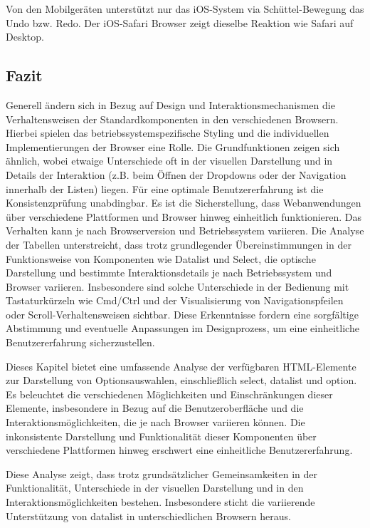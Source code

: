 Von den Mobilgeräten unterstützt nur das iOS-System via Schüttel-Bewegung das Undo bzw. Redo.
Der iOS-Safari Browser zeigt dieselbe Reaktion wie Safari auf Desktop.


\clearpage
\subsection{Fazit}
\label{sec:summeryExisting}

Generell ändern sich in Bezug auf Design und Interaktionsmechanismen die Verhaltensweisen der Standardkomponenten in den verschiedenen Browsern. 
Hierbei spielen das betriebssystemspezifische Styling und die individuellen Implementierungen der Browser eine Rolle. 
Die Grundfunktionen zeigen sich ähnlich, wobei etwaige Unterschiede oft in der visuellen Darstellung und in Details der Interaktion (z.B. beim Öffnen der Dropdowns oder der Navigation innerhalb der Listen) liegen. 
Für eine optimale Benutzererfahrung ist die Konsistenzprüfung unabdingbar.
Es ist die Sicherstellung, dass Webanwendungen über verschiedene Plattformen und Browser hinweg einheitlich funktionieren. 
Das Verhalten kann je nach Browserversion und Betriebssystem variieren. 
Die Analyse der Tabellen unterstreicht, dass trotz grundlegender Übereinstimmungen in der Funktionsweise von Komponenten wie Datalist und Select, 
die optische Darstellung und bestimmte Interaktionsdetails je nach Betriebssystem und Browser variieren. 
Insbesondere sind solche Unterschiede in der Bedienung mit Tastaturkürzeln wie Cmd/Ctrl und der Visualisierung von Navigationspfeilen oder Scroll-Verhaltensweisen sichtbar. 
Diese Erkenntnisse fordern eine sorgfältige Abstimmung und eventuelle Anpassungen im Designprozess, um eine einheitliche Benutzererfahrung sicherzustellen.

Dieses Kapitel bietet eine umfassende Analyse der verfügbaren HTML-Elemente zur Darstellung von Optionsauswahlen, einschließlich select, datalist und option. 
Es beleuchtet die verschiedenen Möglichkeiten und Einschränkungen dieser Elemente, insbesondere in Bezug auf die Benutzeroberfläche und die Interaktionsmöglichkeiten, die je nach Browser variieren können. 
Die inkonsistente Darstellung und Funktionalität dieser Komponenten über verschiedene Plattformen hinweg erschwert eine einheitliche Benutzererfahrung.

Diese Analyse zeigt, dass trotz grundsätzlicher Gemeinsamkeiten in der Funktionalität, Unterschiede in der visuellen Darstellung und in den Interaktionsmöglichkeiten bestehen. 
Insbesondere sticht die variierende Unterstützung von datalist in unterschiedlichen Browsern heraus.

